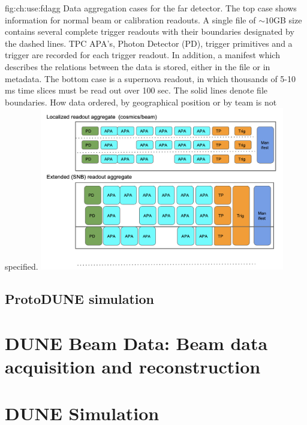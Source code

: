 \documentclass[../main-00.tex]{subfiles}
\begin{document}
\begin{dunefigure}
{fig:ch:use:fdagg}
{Data aggregation cases for the far detector. The top case shows information for normal beam or calibration readouts. A single file of $\sim 10$GB size contains several complete trigger readouts with their boundaries designated by the dashed lines.  TPC APA's, Photon Detector (PD),  trigger primitives and a trigger  are recorded for each trigger readout.  In addition, a manifest which describes the relations between the data is stored, either in the file or in metadata.  The bottom case is a supernova readout, in which thousands of 5-10 ms time slices must be read out over 100 sec.  The solid lines denote file boundaries. How data ordered, by geographical position or by team is not specified.}
\includegraphics[width=0.8\textwidth]{graphics/IntroFigures/DataAggregation.png}
\end{dunefigure}

\subsection{ProtoDUNE simulation}

 
\section{DUNE Beam Data: Beam data acquisition and reconstruction }
\label{sec:use:ndbeam}  %

\section{DUNE Simulation}   
\end{document}
